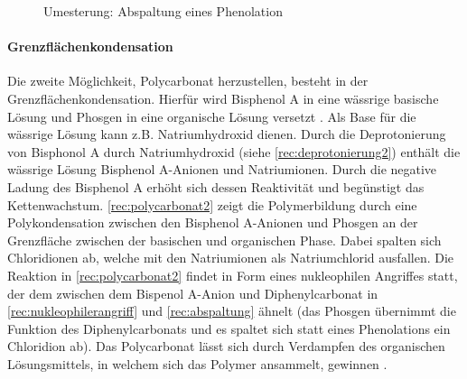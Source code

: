 {    \begin{figure}[H]
        \begin{center}
            \footnotesize
            \setatomsep{1.7em}


            \vspace{10pt}

            \chemrel{->}
            \chemnameinit{}
            \chemsign{+}

            \caption{Umesterung: Abspaltung eines Phenolation}
            \label{rec:abspaltung}
        \end{center}
    \end{figure}
}{}

\paragraph{Grenzflächenkondensation} Die zweite Möglichkeit, Polycarbonat
herzustellen, besteht in der Grenzflächenkondensation. Hierfür wird Bisphenol A
in eine wässrige basische Lösung und Phosgen in eine organische Lösung versetzt
\cite{cuzpe}. Als Base für die wässrige Lösung kann z.B. Natriumhydroxid dienen.
Durch die Deprotonierung von Bisphonol A durch Natriumhydroxid (siehe
\autoref{rec:deprotonierung2}) enthält die wässrige Lösung Bisphenol A-Anionen
und Natriumionen. Durch die negative Ladung des Bisphenol A erhöht sich dessen
Reaktivität und begünstigt das Kettenwachstum. \autoref{rec:polycarbonat2} zeigt
die Polymerbildung durch eine Polykondensation zwischen den Bisphenol A-Anionen
und Phosgen an der Grenzfläche zwischen der basischen und organischen Phase.
Dabei spalten sich Chloridionen ab, welche mit den Natriumionen als
Natriumchlorid ausfallen. Die Reaktion in \autoref{rec:polycarbonat2} findet in
Form eines nukleophilen Angriffes statt, der dem zwischen dem Bispenol A-Anion
und Diphenylcarbonat in \autoref{rec:nukleophilerangriff} und
\autoref{rec:abspaltung} ähnelt (das Phosgen übernimmt die Funktion des
Diphenylcarbonats und es spaltet sich statt eines Phenolations ein Chloridion
ab). Das Polycarbonat lässt sich durch Verdampfen des organischen
Lösungsmittels, in welchem sich das Polymer ansammelt, gewinnen \cite{garoo}.

